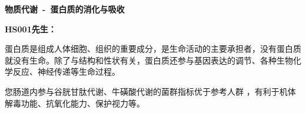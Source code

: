 

\usepackage{graphicx}
\graphicspath{{cores/}}



\setlength{\arrayrulewidth}{0.5pt}
\fontsize{9.3pt}{17pt}\selectfont
\color{gray2}

\vspace*{0mm}
\begin{center}
{\bf\sanhao 物质代谢~-~蛋白质的消化与吸收}
\end{center}


\medskip
\noindent
{\bf\xiaosihao HS001先生：}

\bigskip

蛋白质是组成人体细胞、组织的重要成分，是生命活动的主要承担者，没有蛋白质就没有生命。除了与结构和性状有关，蛋白质还参与基因表达的调节、各种生物化学反应、神经传递等生命过程。

您肠道内参与谷胱甘肽代谢、牛磺酸代谢的菌群指标优于参考人群
，有利于机体解毒功能、抗氧化能力、保护视力等。


